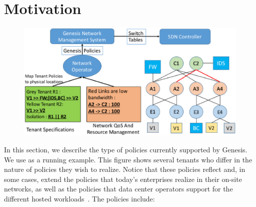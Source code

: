 \section{Motivation}
\begin{figure}
	\includegraphics[width=\columnwidth,center]{figures/architecture.eps}
	\label{fig:architecture}
\end{figure}
In this section, we describe the type of policies currently supported by
Genesis. %
We use  as a running example. This figure shows several
tenants who differ in the nature of policies they wish to realize. 
Notice that these policies reflect and, in some cases, extend the
policies that today's enterprises realize in their on-site networks, as
well as the policies that data center operators support for the different hosted
workloads~\cite{mpa-imc15}.  The policies include:





